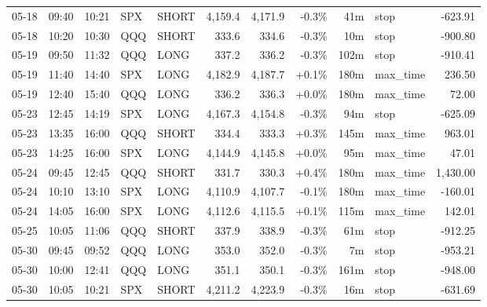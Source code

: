\documentclass[11pt,a4paper,twoside]{article}
\begin{document}
\begin{center}
\begin{longtable}{>{\color{txtmain}}l l l l l r r r r >{\color{txtmain}}l r}
05-18 & 09:40 & 10:21 & SPX & SHORT & 4,159.4 & 4,171.9 & \textcolor{lossred}{-0.3\%} & 41m & stop & \textcolor{lossred}{-623.91} \\
05-18 & 10:20 & 10:30 & QQQ & SHORT & 333.6 & 334.6 & \textcolor{lossred}{-0.3\%} & 10m & stop & \textcolor{lossred}{-900.80} \\
05-19 & 09:50 & 11:32 & QQQ & LONG & 337.2 & 336.2 & \textcolor{lossred}{-0.3\%} & 102m & stop & \textcolor{lossred}{-910.41} \\
05-19 & 11:40 & 14:40 & SPX & LONG & 4,182.9 & 4,187.7 & \textcolor{wingreen}{+0.1\%} & 180m & max\_time & \textcolor{wingreen}{236.50} \\
05-19 & 12:40 & 15:40 & QQQ & LONG & 336.2 & 336.3 & \textcolor{wingreen}{+0.0\%} & 180m & max\_time & \textcolor{wingreen}{72.00} \\
05-23 & 12:45 & 14:19 & SPX & LONG & 4,167.3 & 4,154.8 & \textcolor{lossred}{-0.3\%} & 94m & stop & \textcolor{lossred}{-625.09} \\
05-23 & 13:35 & 16:00 & QQQ & SHORT & 334.4 & 333.3 & \textcolor{wingreen}{+0.3\%} & 145m & max\_time & \textcolor{wingreen}{963.01} \\
05-23 & 14:25 & 16:00 & SPX & LONG & 4,144.9 & 4,145.8 & \textcolor{wingreen}{+0.0\%} & 95m & max\_time & \textcolor{wingreen}{47.01} \\
05-24 & 09:45 & 12:45 & QQQ & SHORT & 331.7 & 330.3 & \textcolor{wingreen}{+0.4\%} & 180m & max\_time & \textcolor{wingreen}{1,430.00} \\
05-24 & 10:10 & 13:10 & SPX & LONG & 4,110.9 & 4,107.7 & \textcolor{lossred}{-0.1\%} & 180m & max\_time & \textcolor{lossred}{-160.01} \\
05-24 & 14:05 & 16:00 & SPX & LONG & 4,112.6 & 4,115.5 & \textcolor{wingreen}{+0.1\%} & 115m & max\_time & \textcolor{wingreen}{142.01} \\
05-25 & 10:05 & 11:06 & QQQ & SHORT & 337.9 & 338.9 & \textcolor{lossred}{-0.3\%} & 61m & stop & \textcolor{lossred}{-912.25} \\
05-30 & 09:45 & 09:52 & QQQ & LONG & 353.0 & 352.0 & \textcolor{lossred}{-0.3\%} & 7m & stop & \textcolor{lossred}{-953.21} \\
05-30 & 10:00 & 12:41 & QQQ & LONG & 351.1 & 350.1 & \textcolor{lossred}{-0.3\%} & 161m & stop & \textcolor{lossred}{-948.00} \\
05-30 & 10:05 & 10:21 & SPX & SHORT & 4,211.2 & 4,223.9 & \textcolor{lossred}{-0.3\%} & 16m & stop & \textcolor{lossred}{-631.69} \\

\end{longtable}
\end{center}
\end{document}
